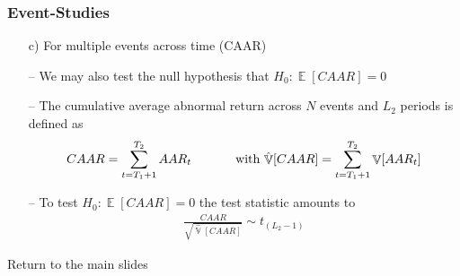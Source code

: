 \documentclass[xcolor=dvipsnames, english, 8pt]{beamer}
\DeclareMathOperator{\E}{\mathbb{E}}
\DeclareMathOperator{\V}{\mathbb{V}}
\begin{document}
        \begin{frame}
            \frametitle{Event-Studies}

        \begin{enumerate}
            \item[c)] For multiple events across time (CAAR)\vspace{0.25cm}\\
            \item[--] We may also test the null hypothesis that $H_0:\E[CAAR]=0$
            \item[--] The cumulative average abnormal return across $N$ events and $L_2$ periods is defined as
            \begin{align}
                CAAR = \sum_{t=T_1+1}^{T_2} AAR_{t} \text{ \hspace{1cm} with }\hat{\V}[CAAR] = \sum_{t=T_1+1}^{T_2} \V[AAR_{t}]
            \end{align}
            \item[--] To test $H_0:\E[CAAR]=0$ the test statistic amounts to
            \begin{align}
                \frac{CAAR}{\sqrt{\hat{\V}[CAAR]}} \sim t_{(L_2-1)}
            \end{align}
        \end{enumerate}
        Return to the main slides \hyperlink{event_studies_main}{}
        \end{frame}
\end{document}
